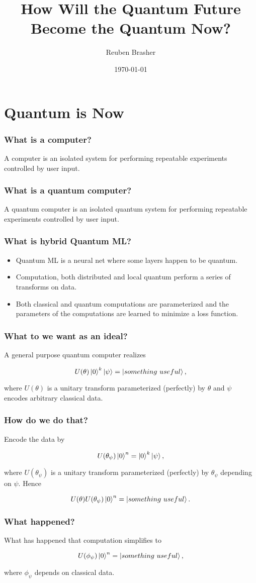 \documentclass{beamer}
\title{How Will the Quantum Future Become the Quantum Now?}
\author{Reuben Brasher}
\date{\today}
\begin{document}
\frame{\titlepage}

\section[Outline]{}
\frame{\tableofcontents}

\section{Quantum is Now}

\frame
{
   \frametitle{What is a computer?}

   A computer is an isolated system for performing repeatable experiments controlled by user input.
}

\frame
{
   \frametitle{What is a quantum computer?}

   A quantum computer is an isolated quantum system for performing repeatable experiments controlled by user input.
}

\frame
{
   \frametitle{What is hybrid Quantum ML?}

   \begin{itemize}
      \item<1-> Quantum ML is a neural net where some layers happen to be quantum.

      \item<2-> Computation, both distributed and local quantum perform a series of transforms on data.

      \item<3-> Both classical and quantum computations are parameterized and the parameters of
   the computations are learned to minimize a loss function.

   \end{itemize}
}

\frame
{
   \frametitle{What to we want as an ideal?}

    A general purpose quantum computer realizes

   $$U(\theta) \ket{0}^k \ket{\psi} = \ket{something\ useful},$$

   where $U(\theta)$ is a unitary transform parameterized (perfectly) by $\theta$ and $\psi$ encodes arbitrary classical
   data.
}

\frame
{
   \frametitle{How do we do that?}

   Encode the data by

   $$U(\theta_\psi) \ket{0}^n = \ket{0}^k \ket{\psi},$$

   where $U(\theta_\psi)$ is a unitary transform parameterized (perfectly) by $\theta_\psi$ depending on $\psi$. Hence

   $$U(\theta) U(\theta_\psi) \ket{0}^n = \ket{something\ useful}.$$
}

\frame
{
   \frametitle{What happened?}

   What has happened that computation simplifies to

   $$U(\phi_\psi) \ket{0}^n = \ket{something\ useful},$$

   where $\phi_\psi$ depends on classical data.
}
\end{document}
